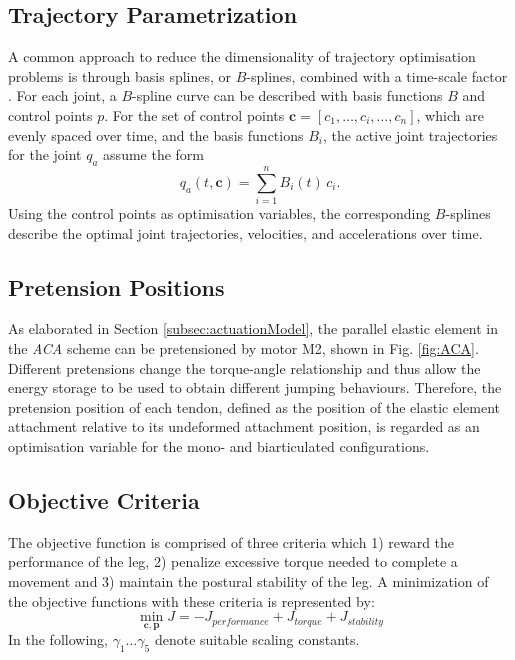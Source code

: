 \documentclass[letterpaper, 10 pt, conference]{ieeeconf}  %
\begin{document}
\subsection{Trajectory Parametrization} 
\label{subsec:trajectoryParametrization}
A common approach to reduce the dimensionality of trajectory optimisation problems is through basis splines, or $B$-splines, combined with a time-scale factor \cite{ude2000planning,babivc2009biarticulated,wang1999weight,albro2001optimal}. For each joint, a $B$-spline curve can be described with basis functions $B$ and control points $p$. For the set of control points $\mathbf{c}=\left[c_1,\dots,c_i,\dots,c_n\right]$, which are evenly spaced over time, and the basis functions $B_i$, the active joint trajectories for the joint $q_a$ assume the form
\begin{equation}
	q_a(t,\mathbf{c}) = \sum_{i=1}^{n} B_i (t) \, c_i.
\end{equation}
Using the control points as optimisation variables, the corresponding $B$-splines describe the optimal joint trajectories, velocities, and accelerations over time. 

\subsection{Pretension Positions} 
\label{subsec:pretensionPositions}
As elaborated in Section \ref{subsec:actuationModel}, the parallel elastic element in the \textit{ACA} scheme can be pretensioned by motor M2, shown in Fig. \ref{fig:ACA}. Different pretensions change the torque-angle relationship and thus allow the energy storage to be used to obtain different jumping behaviours. Therefore, the pretension position of each tendon, defined as the position of the elastic element attachment relative to its undeformed attachment position, is regarded as an optimisation variable for the mono- and biarticulated configurations.

\subsection{Objective Criteria} 
\label{subsec:objectiveCriteria}
The objective function is comprised of three criteria which 1) reward the performance of the leg, 2) penalize excessive torque needed to complete a movement and 3) maintain the postural stability of the leg. A minimization of the objective functions with these criteria is represented by:
\begin{equation}
	\min_{\mathbf{c}, \mathbf{p}} J = -J_{performance} + J_{torque} + J_{stability}
\end{equation}
In the following, $\gamma_1 \dots \gamma_5$ denote suitable scaling constants.
\end{document}
